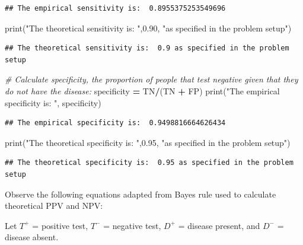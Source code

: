 \documentclass[
]{article}
\newenvironment{Shaded}{\begin{snugshade}}{\end{snugshade}}
\newcommand{\BuiltInTok}[1]{#1}
\newcommand{\CommentTok}[1]{\textcolor[rgb]{0.56,0.35,0.01}{\textit{#1}}}
\newcommand{\FloatTok}[1]{\textcolor[rgb]{0.00,0.00,0.81}{#1}}
\newcommand{\NormalTok}[1]{#1}
\newcommand{\OperatorTok}[1]{\textcolor[rgb]{0.81,0.36,0.00}{\textbf{#1}}}
\newcommand{\StringTok}[1]{\textcolor[rgb]{0.31,0.60,0.02}{#1}}
\begin{document}
\begin{verbatim}
## The empirical sensitivity is:  0.8955375253549696
\end{verbatim}

\begin{Shaded}
\begin{Highlighting}[]
\BuiltInTok{print}\NormalTok{(}\StringTok{"The theoretical sensitivity is: "}\NormalTok{,}\FloatTok{0.90}\NormalTok{, }\StringTok{"as specified in the problem setup"}\NormalTok{)}
\end{Highlighting}
\end{Shaded}

\begin{verbatim}
## The theoretical sensitivity is:  0.9 as specified in the problem setup
\end{verbatim}

\begin{Shaded}
\begin{Highlighting}[]
\CommentTok{\# Calculate specificity, the proportion of people that test negative given that they do not have the disease:}
\NormalTok{specificity }\OperatorTok{=}\NormalTok{ TN}\OperatorTok{/}\NormalTok{(TN }\OperatorTok{+}\NormalTok{ FP)}
\BuiltInTok{print}\NormalTok{(}\StringTok{"The empirical specificity is: "}\NormalTok{, specificity)}
\end{Highlighting}
\end{Shaded}

\begin{verbatim}
## The empirical specificity is:  0.9498816664626434
\end{verbatim}

\begin{Shaded}
\begin{Highlighting}[]
\BuiltInTok{print}\NormalTok{(}\StringTok{"The theoretical specificity is: "}\NormalTok{,}\FloatTok{0.95}\NormalTok{, }\StringTok{"as specified in the problem setup"}\NormalTok{)}
\end{Highlighting}
\end{Shaded}

\begin{verbatim}
## The theoretical specificity is:  0.95 as specified in the problem setup
\end{verbatim}

Observe the following equations adapted from Bayes rule used to
calculate theoretical PPV and NPV:

Let \(T^+\) = positive test, \(T^-\) = negative test, \(D^+\) = disease
present, and \(D^-\) = disease absent.
\end{document}
